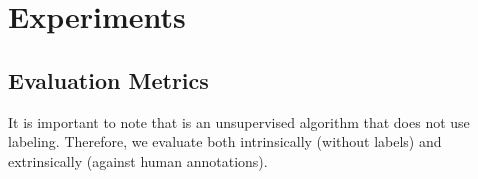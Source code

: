 \documentclass[0-main.tex]{subfiles}
\begin{document}
\section{Experiments}
\label{sec:expt}

\begin{table}[t!]
\vspace{5pt}
\centering
{}
\caption{The silhouette score for each of the techniques and dimensionality reduction schemes on a subset of suturing demonstrations (5 expert examples). We found that PCA (100 dims) applied to VGG conv5\_3 maximizes silhouette score  \label{tab:visual}}
\vspace{-10pt}
\end{table}


\subsection{Evaluation Metrics}\label{sec:metrics}
It is important to note that \tsc is an unsupervised algorithm that does not use labeling.
Therefore, we evaluate \tsc both intrinsically (without labels) and extrinsically (against human annotations).
\end{document}
